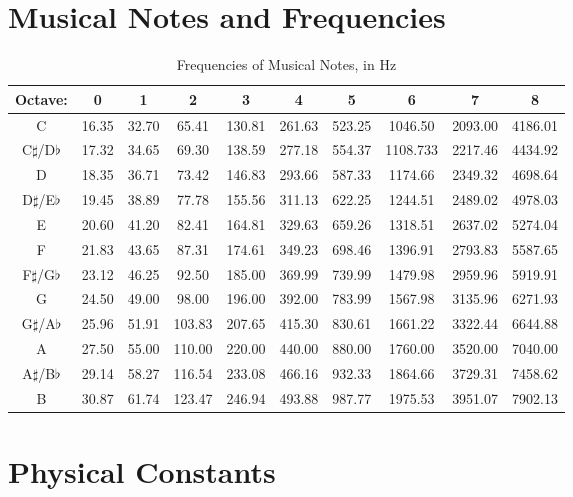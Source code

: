 \newpage

\section{Musical Notes and Frequencies}



\begin{center}

	
	\begin{table}[h]
		\caption{\label{tab:Frequencies}Frequencies of Musical Notes, in Hz}	
		\begin{tabular}{ |c | c | c | c | c | c | c | c | c |c|}
		
			\hline 
			\textbf{Octave:} & 0 & 1 & 2 &3&4&5&6&7&8 \\
			\hline 
			C & 16.35 & 32.70 & 65.41 & 130.81 & 261.63 & 523.25 & 1046.50 & 2093.00 & 4186.01 \\
			\hline
			C$\sharp$/D$\flat$& 17.32 & 34.65 & 69.30 & 138.59& 277.18 & 554.37 & 1108.733 & 2217.46 & 4434.92 \\
			\hline
			D & 18.35 & 36.71 & 73.42 & 146.83 & 293.66 & 587.33 & 1174.66 & 2349.32 & 4698.64 \\
			\hline
			D$\sharp$/E$\flat$& 19.45 &38.89 & 77.78& 155.56& 311.13& 622.25 & 1244.51& 2489.02& 4978.03 \\
			\hline
			E &	20.60&41.20&82.41&164.81&329.63&659.26&1318.51&2637.02&5274.04\\
			\hline
			F  & 21.83&	43.65&	87.31&	174.61&	349.23&	698.46&	1396.91&	2793.83& 5587.65 \\
			\hline
			F$\sharp$/G$\flat$& 23.12&	46.25&92.50& 185.00&369.99&	739.99&	1479.98&2959.96&5919.91 \\
			\hline
			G & 24.50&49.00&98.00&196.00&392.00&783.99&1567.98&3135.96&6271.93\\
			\hline
			G$\sharp$/A$\flat$& 25.96&51.91&103.83&207.65&415.30&830.61&1661.22&3322.44&6644.88\\
			\hline
			A &27.50&55.00&110.00&220.00&440.00&880.00&1760.00&3520.00&7040.00\\
			\hline
			A$\sharp$/B$\flat$ & 29.14&58.27&116.54&233.08&466.16&	932.33&1864.66&3729.31&7458.62\\
			\hline
			B& 30.87&61.74&123.47&246.94&493.88&987.77&1975.53&3951.07&7902.13\\
			\hline			
		\end{tabular}
	\end{table}
\end{center}



\newpage






\section{Physical Constants}
